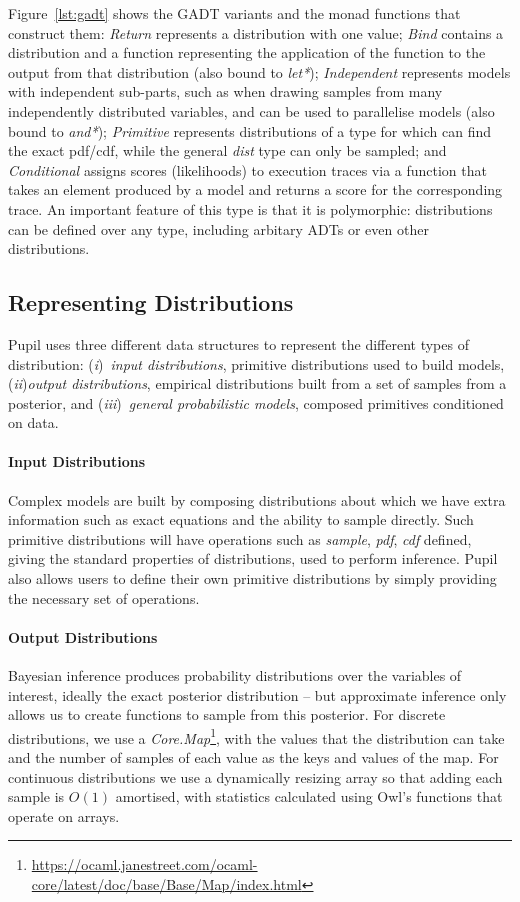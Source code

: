 \documentclass[sigconf]{acmart}
\newcommand{\one}{({\em i})\/}
\newcommand{\two}{({\em ii})\/}
\newcommand{\three}{({\em iii})\/}
\newcommand{\pupil}{Pupil\xspace}
\begin{document}
Figure~\ref{lst:gadt} shows the GADT variants and the monad functions that construct them: \emph{Return} represents a distribution with one value; \emph{Bind} contains a distribution and a function representing the application of the function to the output from that distribution (also bound to \emph{let*}); \emph{Independent} represents models with independent sub-parts, such as when drawing samples from many independently distributed variables, and can be used to parallelise models (also bound to \emph{and*}); \emph{Primitive} represents distributions of a type for which can find the exact pdf/cdf, while the general \emph{dist} type can only be sampled; and \emph{Conditional} assigns scores (likelihoods) to execution traces via a function that takes an element produced by a model and returns a score for the corresponding trace. An important feature of this type is that it is polymorphic: distributions can be defined over any type, including arbitary ADTs or even other distributions.

\subsection{Representing Distributions}
\pupil uses three different data structures to represent the different types of distribution: \one~\emph{input distributions}, primitive distributions used to build models, \two\emph{output distributions}, empirical distributions built from a set of samples from a posterior, and \three~\emph{general probabilistic models}, composed primitives conditioned on data.

\paragraph{Input Distributions}
Complex models are built by composing distributions about which we have extra information such as exact equations and the ability to sample directly. Such primitive distributions will have operations such as \emph{sample}, \emph{pdf}, \emph{cdf} defined, giving the standard properties of distributions, used to perform inference. \pupil also allows users to define their own primitive distributions by simply providing the necessary set of operations.

\paragraph{Output Distributions}
Bayesian inference produces probability distributions over the variables of interest, ideally the exact posterior distribution -- but approximate inference only allows us to create functions to sample from this posterior. For discrete distributions, we use a \emph{Core.Map}\footnote{\url{https://ocaml.janestreet.com/ocaml-core/latest/doc/base/Base/Map/index.html}}, with the values that the distribution can take and the number of samples of each value as the keys and values of the map. For continuous distributions we use a dynamically resizing array so that adding each sample is $O(1)$ amortised, with statistics calculated using Owl's functions that operate on arrays.
\end{document}

